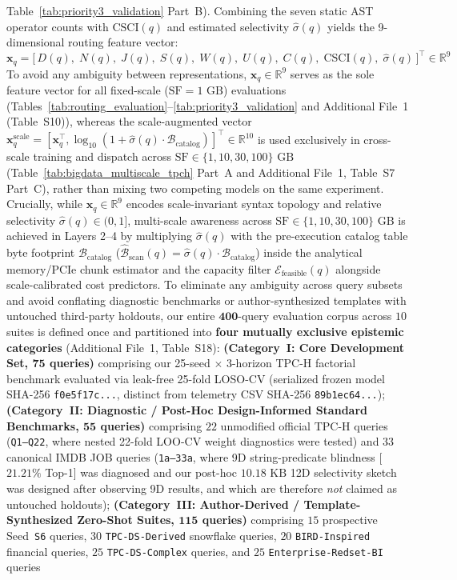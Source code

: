 \documentclass[10pt,a4paper]{article}
\begin{document}
Table~\ref{tab:priority3_validation} Part~B). Combining the seven static AST operator counts with $\text{CSCI}(q)$ and estimated selectivity $\hat{\sigma}(q)$ yields the 9-dimensional routing feature vector:
\begin{equation}
    \mathbf{x}_q = \big[\, D(q),\; N(q),\; J(q),\; S(q),\; W(q),\; U(q),\; C(q),\; \text{CSCI}(q),\; \hat{\sigma}(q) \,\big]^{\top} \in \mathbb{R}^{9}
\end{equation}
 To avoid any ambiguity between representations, $\mathbf{x}_q \in \mathbb{R}^{9}$ serves as the sole feature vector for all fixed-scale ($\text{SF}=1\text{ GB}$) evaluations (Tables~\ref{tab:routing_evaluation}--\ref{tab:priority3_validation} and Additional File~1 (Table~S10)), whereas the scale-augmented vector $\mathbf{x}_q^{\text{scale}} = [\mathbf{x}_q^{\top}, \log_{10}(1+\hat{\sigma}(q)\cdot\mathcal{B}_{\text{catalog}})]^{\top} \in \mathbb{R}^{10}$ is used exclusively in cross-scale training and dispatch across $\text{SF}\in\{1,10,30,100\}\text{ GB}$ (Table~\ref{tab:bigdata_multiscale_tpch} Part~A and Additional File~1, Table~S7 Part~C), rather than mixing two competing models on the same experiment. Crucially, while $\mathbf{x}_q \in \mathbb{R}^9$ encodes scale-invariant syntax topology and relative selectivity $\hat{\sigma}(q) \in (0,1]$, multi-scale awareness across $\text{SF} \in \{1, 10, 30, 100\}$ GB is achieved in Layers 2--4 by multiplying $\hat{\sigma}(q)$ with the pre-execution catalog table byte footprint $\mathcal{B}_{\text{catalog}}$ ($\hat{\mathcal{B}}_{\text{scan}}(q) = \hat{\sigma}(q)\cdot \mathcal{B}_{\text{catalog}}$) inside the analytical memory/PCIe chunk estimator and the capacity filter $\mathcal{E}_{\text{feasible}}(q)$ alongside scale-calibrated cost predictors. To eliminate any ambiguity across query subsets and avoid conflating diagnostic benchmarks or author-synthesized templates with untouched third-party holdouts, our entire $\mathbf{400}$-query evaluation corpus across $10$ suites is defined once and partitioned into \textbf{four mutually exclusive epistemic categories} (Additional File~1, Table~S18): \textbf{(Category~I: Core Development Set, $\mathbf{75}$ queries)} comprising our 25-seed $\times$ 3-horizon TPC-H factorial benchmark evaluated via leak-free 25-fold LOSO-CV (serialized frozen model SHA-256 \texttt{f0e5f17c...}, distinct from telemetry CSV SHA-256 \texttt{89b1ec64...}); \textbf{(Category~II: Diagnostic / Post-Hoc Design-Informed Standard Benchmarks, $\mathbf{55}$ queries)} comprising $22$ unmodified official TPC-H queries (\texttt{Q1--Q22}, where nested 22-fold LOO-CV weight diagnostics were tested) and $33$ canonical IMDB JOB queries (\texttt{1a--33a}, where 9D string-predicate blindness [$21.21\%$ Top-1] was diagnosed and our post-hoc $10.18\text{ KB}$ 12D selectivity sketch was designed after observing 9D results, and which are therefore \emph{not} claimed as untouched holdouts); \textbf{(Category~III: Author-Derived / Template-Synthesized Zero-Shot Suites, $\mathbf{115}$ queries)} comprising $15$ prospective Seed~\texttt{S6} queries, $30$ \texttt{TPC-DS-Derived} snowflake queries, $20$ \texttt{BIRD-Inspired} financial queries, $25$ \texttt{TPC-DS-Complex} queries, and $25$ \texttt{Enterprise-Redset-BI} queries 
\end{document}
